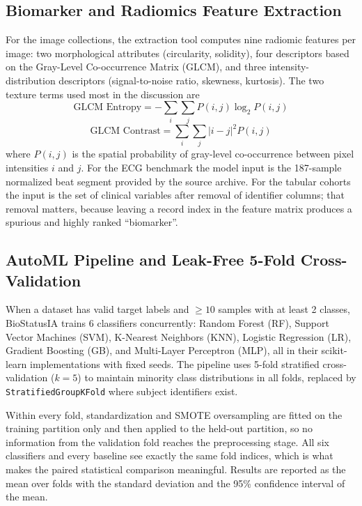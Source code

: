 \documentclass[conference]{IEEEtran}
\begin{document}
\subsection{Biomarker and Radiomics Feature Extraction}
For the image collections, the extraction tool computes nine radiomic features per image: two morphological attributes (circularity, solidity), four descriptors based on the Gray-Level Co-occurrence Matrix (GLCM), and three intensity-distribution descriptors (signal-to-noise ratio, skewness, kurtosis). The two texture terms used most in the discussion are
\begin{equation}
\text{GLCM Entropy} = -\sum_{i}\sum_{j} P(i,j) \log_2 P(i,j)
\end{equation}
\begin{equation}
\text{GLCM Contrast} = \sum_{i}\sum_{j} |i - j|^2 P(i,j)
\end{equation}
where $P(i,j)$ is the spatial probability of gray-level co-occurrence between pixel intensities $i$ and $j$. For the ECG benchmark the model input is the 187-sample normalized beat segment provided by the source archive. For the tabular cohorts the input is the set of clinical variables after removal of identifier columns; that removal matters, because leaving a record index in the feature matrix produces a spurious and highly ranked ``biomarker''.

\subsection{AutoML Pipeline and Leak-Free 5-Fold Cross-Validation}
When a dataset has valid target labels and $\ge 10$ samples with at least 2 classes, BioStatusIA trains 6 classifiers concurrently: Random Forest (RF), Support Vector Machines (SVM), K-Nearest Neighbors (KNN), Logistic Regression (LR), Gradient Boosting (GB), and Multi-Layer Perceptron (MLP), all in their scikit-learn implementations \cite{scikit2011} with fixed seeds. The pipeline uses 5-fold stratified cross-validation ($k=5$) to maintain minority class distributions in all folds, replaced by \texttt{StratifiedGroupKFold} where subject identifiers exist.

Within every fold, standardization and SMOTE oversampling are fitted on the training partition only and then applied to the held-out partition, so no information from the validation fold reaches the preprocessing stage. All six classifiers and every baseline see exactly the same fold indices, which is what makes the paired statistical comparison meaningful. Results are reported as the mean over folds with the standard deviation and the 95\% confidence interval of the mean.
\end{document}
